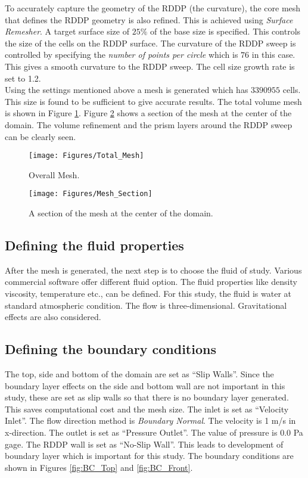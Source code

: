 \noindent To accurately capture the geometry of the RDDP (the curvature), the core mesh that defines the RDDP geometry is also refined. This is achieved using \textit{Surface Remesher}. A target surface size of $25\%$ of the base size is specified. This controls the size of the cells on the RDDP surface. The curvature of the RDDP sweep is controlled by specifying the \textit{number of points per circle} which is $76$ in this case. This gives a smooth curvature to the RDDP sweep. The cell size growth rate is set to 1.2.\\
Using the settings mentioned above a mesh is generated which has $3390955$ cells. This size is found to be sufficient to give accurate results. The total volume mesh is shown in Figure \ref{fig:Total_Mesh}. Figure \ref{fig:Mesh_Section} shows a section of the mesh at the center of the domain. The volume refinement and the prism layers around the RDDP sweep can be clearly seen.\\

\begin{figure}
\centering
\texttt{[image: Figures/Total\_Mesh]}
\caption{\label{fig:Total_Mesh}Overall Mesh.}
\end{figure}

\begin{figure}
\centering
\texttt{[image: Figures/Mesh\_Section]}
\caption{\label{fig:Mesh_Section}A section of the mesh at the center of the domain.}
\end{figure}

\subsection*{Defining the fluid properties}
After the mesh is generated, the next step is to choose the fluid of study. Various commercial software offer different fluid option. The fluid properties like density viscosity, temperature etc., can be defined. For this study, the fluid is water at standard atmospheric condition. The flow is three-dimensional. Gravitational effects are also considered.

\subsection*{Defining the boundary conditions}
The top, side and bottom of the domain are set as ``Slip Walls''. Since the boundary layer effects on the side and bottom wall are not important in this study, these are set as slip walls so that there is no boundary layer generated. This saves computational cost and the mesh size. The inlet is set as ``Velocity Inlet''. The flow direction method is \textit{Boundary Normal}. The velocity is 1 m/s in x-direction. The outlet is set as ``Pressure Outlet''. The value of pressure is 0.0 Pa gage. The RDDP wall is set as ``No-Slip Wall''. This leads to development of boundary layer which is important for this study. The boundary conditions are shown in Figures \ref{fig:BC_Top} and \ref{fig:BC_Front}.\\

